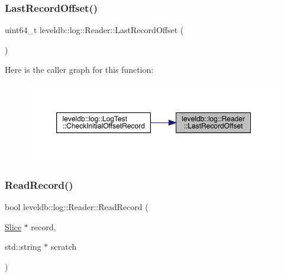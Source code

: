 \subsubsection{\texorpdfstring{LastRecordOffset()}{LastRecordOffset()}}
{\footnotesize\ttfamily uint64\+\_\+t leveldb\+::log\+::\+Reader\+::\+Last\+Record\+Offset (\begin{DoxyParamCaption}{ }\end{DoxyParamCaption})}

Here is the caller graph for this function\+:
\nopagebreak
\begin{figure}[H]
\begin{center}
\leavevmode
\includegraphics[width=350pt]{classleveldb_1_1log_1_1_reader_a358c5545069d86a61948ac0a021aa7f6_icgraph}
\end{center}
\end{figure}
\mbox{\label{classleveldb_1_1log_1_1_reader_a84059598c9367cb677a9d70d77993282}} 
\subsubsection{\texorpdfstring{ReadRecord()}{ReadRecord()}}
{\footnotesize\ttfamily bool leveldb\+::log\+::\+Reader\+::\+Read\+Record (\begin{DoxyParamCaption}\item[{\mbox{\hyperlink{classleveldb_1_1_slice}{Slice}} $\ast$}]{record,  }\item[{std\+::string $\ast$}]{scratch }\end{DoxyParamCaption})}

